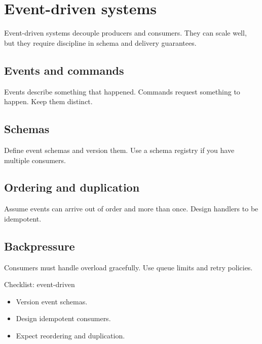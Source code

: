 \chapter{Event-driven systems}

Event-driven systems decouple producers and consumers.
They can scale well, but they require discipline in schema and delivery guarantees.

\section{Events and commands}
Events describe something that happened.
Commands request something to happen.
Keep them distinct.

\section{Schemas}
Define event schemas and version them.
Use a schema registry if you have multiple consumers.

\section{Ordering and duplication}
Assume events can arrive out of order and more than once.
Design handlers to be idempotent.

\section{Backpressure}
Consumers must handle overload gracefully.
Use queue limits and retry policies.

\begin{checklistbox}{Checklist: event-driven}
\begin{itemize}[nosep]
  \item Version event schemas.
  \item Design idempotent consumers.
  \item Expect reordering and duplication.
\end{itemize}
\end{checklistbox}
